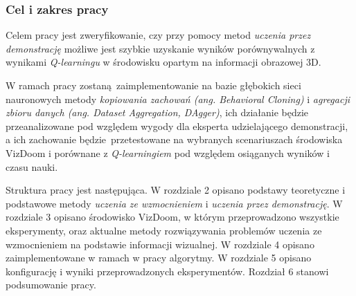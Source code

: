 \subsubsection{Cel i zakres pracy}

Celem pracy jest zweryfikowanie, czy przy pomocy metod \textit{uczenia przez demonstrację} możliwe jest szybkie uzyskanie wyników porównywalnych z wynikami \textit {Q-learningu} w środowisku opartym na informacji obrazowej 3D.

W ramach pracy zostaną zaimplementowanie na bazie głębokich sieci nauronowych metody \textit{kopiowania zachowań (ang. Behavioral Cloning)} i \textit{agregacji zbioru danych (ang. Dataset Aggregation, DAgger)}, ich działanie będzie przeanalizowane pod względem wygody dla eksperta udzielającego demonstracji, a ich zachowanie będzie przetestowane na wybranych scenariuszach środowiska VizDoom i porównane z \textit {Q-learningiem} pod względem osiąganych wyników i czasu nauki.

Struktura pracy jest następująca. W rozdziale 2 opisano podstawy teoretyczne i podstawowe metody \textit{uczenia ze wzmocnieniem} i \textit{uczenia przez demonstrację}. W rozdziale 3 opisano środowisko VizDoom, w którym przeprowadzono wszystkie eksperymenty, oraz aktualne metody rozwiązywania problemów uczenia ze wzmocnieniem na podstawie informacji wizualnej. W rozdziale 4 opisano zaimplementowane w ramach w pracy algorytmy. W rozdziale 5 opisano konfigurację i wyniki przeprowadzonych eksperymentów. Rozdział 6 stanowi podsumowanie pracy.




